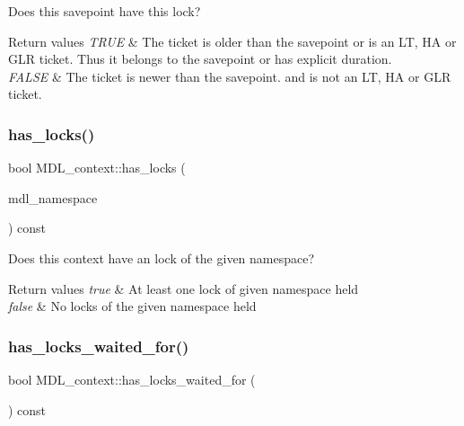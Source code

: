Does this savepoint have this lock?


\begin{DoxyRetVals}{Return values}
{\em T\+R\+UE} & The ticket is older than the savepoint or is an LT, HA or G\+LR ticket. Thus it belongs to the savepoint or has explicit duration. \\
\hline
{\em F\+A\+L\+SE} & The ticket is newer than the savepoint. and is not an LT, HA or G\+LR ticket. \\
\hline
\end{DoxyRetVals}
\mbox{\label{classMDL__context_a3ff2d2559c4ef5075b63978ae516df6e}} 
\subsubsection{\texorpdfstring{has\+\_\+locks()}{has\_locks()}}
{\footnotesize\ttfamily bool M\+D\+L\+\_\+context\+::has\+\_\+locks (\begin{DoxyParamCaption}\item[{\mbox{\hyperlink{structMDL__key_a391ec4bd98fec6852a48f7856546ed3b}{M\+D\+L\+\_\+key\+::enum\+\_\+mdl\+\_\+namespace}}}]{mdl\+\_\+namespace }\end{DoxyParamCaption}) const}

Does this context have an lock of the given namespace?


\begin{DoxyRetVals}{Return values}
{\em true} & At least one lock of given namespace held \\
\hline
{\em false} & No locks of the given namespace held \\
\hline
\end{DoxyRetVals}
\mbox{\label{classMDL__context_ab77b38a67ffb56d071a98efc8879bac6}} 
\subsubsection{\texorpdfstring{has\+\_\+locks\+\_\+waited\+\_\+for()}{has\_locks\_waited\_for()}}
{\footnotesize\ttfamily bool M\+D\+L\+\_\+context\+::has\+\_\+locks\+\_\+waited\+\_\+for (\begin{DoxyParamCaption}{ }\end{DoxyParamCaption}) const}


